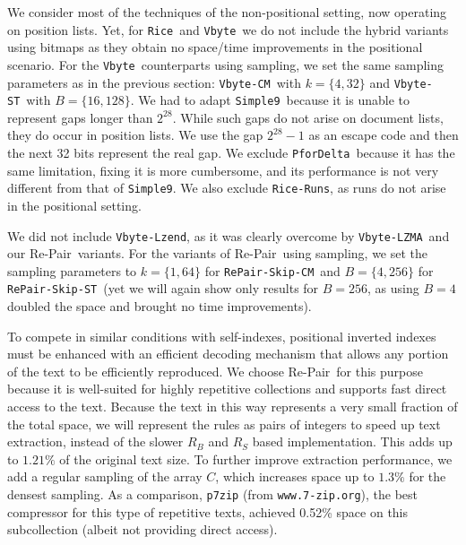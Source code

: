 \documentclass[review]{elsarticle}
\newcommand{\repair}{Re-Pair}
\newcommand{\vbyte}{\texttt{Vbyte}}
\newcommand{\vbyteB}{\texttt{VbyteB}}
\newcommand{\rice}{\texttt{Rice}}
\newcommand{\simplen}{\texttt{Simple9}}
\newcommand{\pfordelta}{\texttt{PforDelta}}
\newcommand{\riceRuns}{\texttt{Rice-Runs}}
\newcommand{\vbyteCM}{\texttt{Vbyte-CM}}
\newcommand{\vbyteCMB}{\texttt{Vbyte-CMB}}
\newcommand{\vbyteST}{\texttt{Vbyte-ST}}
\newcommand{\vbyteSTB}{\texttt{Vbyte-STB}}
\newcommand{\repairSkipCM}{\texttt{RePair-Skip-CM}}
\newcommand{\repairSkipST}{\texttt{RePair-Skip-ST}}
\newcommand{\vbyteLZMA}{\texttt{Vbyte-LZMA}}
\newcommand{\vbyteLzend}{\texttt{Vbyte-Lzend}}
\begin{document}
We consider most of the techniques of the non-positional setting, now
operating on position lists. Yet, for \rice\ and \vbyte\ we do not include the hybrid variants using bitmaps as they obtain no space/time improvements in the positional scenario. For the \vbyte\ counterparts using sampling, we set the same sampling parameters as in the previous section: \vbyteCM\ with $k=\{4,32\}$ and \vbyteST\ with $B=\{16,128\}$.
We had to adapt \simplen\ because it is unable
to represent gaps longer than $2^{28}$. While such gaps do not arise on
document lists, they do occur in position lists. We use the gap $2^{28}-1$
as an escape code and then the next 32 bits represent the real gap. We
exclude \pfordelta\ because it has the same limitation, fixing it is more
cumbersome, and its performance is not very different from that of \simplen.
We also exclude \riceRuns, as runs do not
arise in the positional setting.
%

We did not include \vbyteLzend, as it was clearly overcome by \vbyteLZMA\ and our \repair\ variants.
For the variants of \repair\ using sampling, we set the sampling parameters to $k=\{1,64\}$ for \repairSkipCM\ and $B=\{4,256\}$ for \repairSkipST\ (yet we will again show only results for $B=256$, as using $B=4$ doubled the space and brought no time improvements).

To compete in similar conditions with self-indexes, positional inverted indexes
must be enhanced with an efficient decoding mechanism that allows any portion
of the text to be efficiently reproduced. We choose \repair\ for this purpose because 
it is well-suited for highly repetitive collections and supports fast direct access 
to the text. Because the text in this way represents a very small fraction 
of the total space, we will represent the rules as pairs of integers to speed up text 
extraction, instead of the slower $R_B$ and $R_S$ based implementation. This adds up to 
$1.21\%$ of the original text size. To further improve extraction performance, we add a regular 
sampling of the array $C$, which increases space up to $1.3\%$ for the densest sampling. As 
a comparison, {\tt p7zip} (from {\tt www.7-zip.org}), the best compressor for this type 
of repetitive texts, achieved 0.52\% space on this subcollection (albeit not providing 
direct access).
\end{document}
